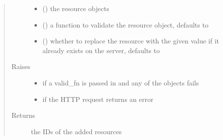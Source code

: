 \documentclass[letterpaper,10pt,english]{sphinxmanual}
\begin{document}
\begin{fulllineitems}
\begin{fulllineitems}
\begin{quote}
\begin{description}
\begin{itemize}
\item {} 
 (\sphinxstyleliteralemphasis{\sphinxupquote{(}}\sphinxstyleliteralemphasis{\sphinxupquote{)}}) \textendash{} the resource objects

\item {} 
 (\sphinxstyleliteralemphasis{\sphinxupquote{, }}) \textendash{} a function to validate the resource object, defaults to 

\item {} 
 (\sphinxstyleliteralemphasis{\sphinxupquote{, }}) \textendash{} whether to replace the resource with the given value if it already exists on the server, defaults to 

\end{itemize}

\item[{Raises}] \leavevmode\begin{itemize}
\item {} 
{\hyperref[\detokenize{autoapi/pine/client/exceptions/index:pine.client.exceptions.PineClientValueException}]{}} \textendash{} if a valid\_fn is passed in and any of the objects fails

\item {} 
{\hyperref[\detokenize{autoapi/pine/client/exceptions/index:pine.client.exceptions.PineClientHttpException}]{}} \textendash{} if the HTTP request returns an error

\end{itemize}

\item[{Returns}] \leavevmode
the IDs of the added resources


\end{description}
\end{quote}
\end{fulllineitems}
\end{fulllineitems}
\end{document}
